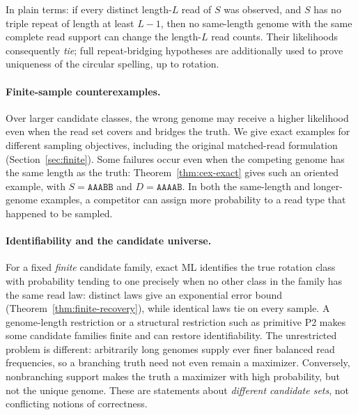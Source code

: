 In plain terms: if every distinct length-$L$ read of $S$ was
observed, and $S$ has no triple repeat of length at least $L-1$,
then no same-length genome with the same complete read support can
change the length-$L$ read counts. Their likelihoods consequently
\emph{tie}; full repeat-bridging hypotheses are additionally used
to prove uniqueness of the circular spelling, up to rotation.

\paragraph{Finite-sample counterexamples.}
Over larger candidate classes, the wrong genome may receive a
higher likelihood even when the read set covers and bridges
the truth. We give exact examples for different sampling objectives,
including the original matched-read formulation
(Section~\ref{sec:finite}). Some failures occur even when the
competing genome has the same length as the truth:
Theorem~\ref{thm:cex-exact} gives such an oriented example,
with $S=\texttt{AAABB}$ and $D=\texttt{AAAAB}$.
In both the same-length and longer-genome examples,
a competitor can assign more probability to a read type
that happened to be sampled.

\paragraph{Identifiability and the candidate universe.}
For a fixed \emph{finite} candidate family, exact ML identifies
the true rotation class with probability tending to one
precisely when no other class in the family has the same
read law: distinct laws give an exponential error bound
(Theorem~\ref{thm:finite-recovery}), while identical laws
tie on every sample. A genome-length restriction or a
structural restriction such as primitive P2 makes some
candidate families finite and can restore identifiability.
The unrestricted problem is different: arbitrarily long
genomes supply ever finer balanced read frequencies, so
a branching truth need not even remain a maximizer.
Conversely, nonbranching support makes the truth a maximizer
with high probability, but not the unique genome.
These are statements about \emph{different candidate sets},
not conflicting notions of correctness.

